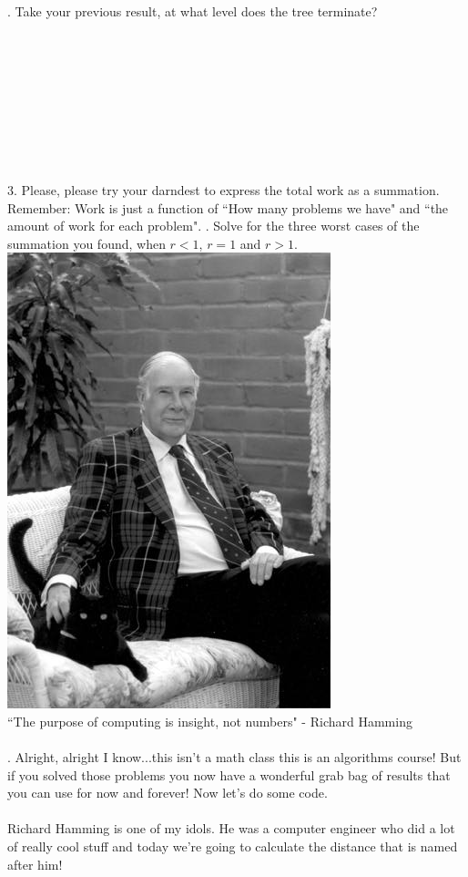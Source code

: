 \documentclass[12pt]{article}
\begin{document}
\newpage
{}. Take your previous result, at what level does the tree terminate?\\\\\\\\\\\\\\\\\\\\
3. Please, please try your darndest to express the total work as a summation. Remember: Work is just a function of ``How many problems we have" and ``the amount of work for each problem".
\newpage
{}. Solve for the three worst cases of the summation you found, when $r<1$, $r=1$ and $r>1$. 
\newpage
\noindent \includegraphics[scale = 0.2]{hamming_cat.jpg}\\
``The purpose of computing is insight, not numbers" - Richard Hamming\\\\
. Alright, alright I know...this isn't a math class this is an algorithms course! But if you solved those problems you now have a wonderful grab bag of results that you can use for now and forever! Now let's do some code.\\\\
Richard Hamming is one of my idols. He was a computer engineer who did a lot of really cool stuff and today we're going to calculate the distance that is named after him!\\\\
\end{document}

